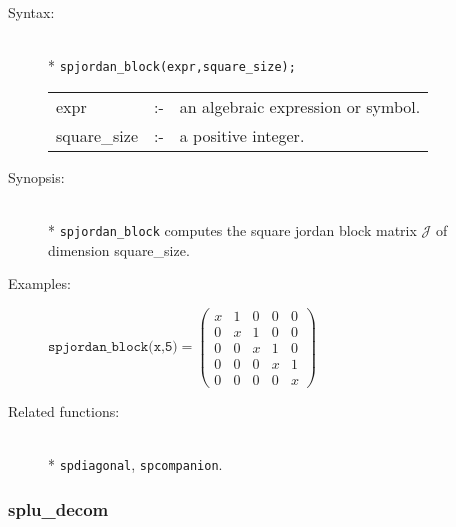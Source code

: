 \begin{description}
\item[Syntax:]\mbox{}\\*
 \texttt{spjordan\_block(expr,square\_size);}\\[2mm]
\begin{tabular}{l l l}
expr        &:-& an algebraic expression or symbol. \\
square\_size &:-& a positive integer.
\end{tabular}

\item[Synopsis:]\mbox{}\\*
\texttt{spjordan\_block} computes the square jordan block matrix $\mathcal{J}$
                of dimension square\_size. 

\item[Examples:]
\begin{flushleft}  
\begin{math}        
\texttt{spjordan\_block(x,5)} = 
\begin{pmatrix} x & 1 & 0 & 0 & 0 \\ 0 & x & 1 & 0 & 0 \\ 0 
& 0 & x & 1 & 0 \\ 0 & 0 & 0 & x & 1 \\ 0 & 0 & 0 & 0 & x
\end{pmatrix} 
\end{math}  
\end{flushleft}

\item[Related functions:]\mbox{}\\*
 \texttt{spdiagonal}, \texttt{spcompanion}.
\end{description}

\subsubsection{splu\_decom}
\label{sparse:splu_decom}


